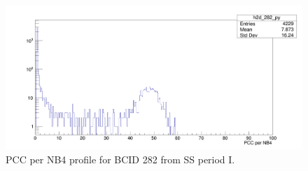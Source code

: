 \begin{center}
  \begin{figure}[h!]
    \centering
    \includegraphics[scale=.18]{Chapter4/ss1_histo_bx282.png}
    \caption[PCC per NB4 profile for BCID 282 from SS period I]{ PCC per NB4 profile for BCID 282 from SS period I.} 
    \label{ss1_hist_282}
  \end{figure}
\end{center}


